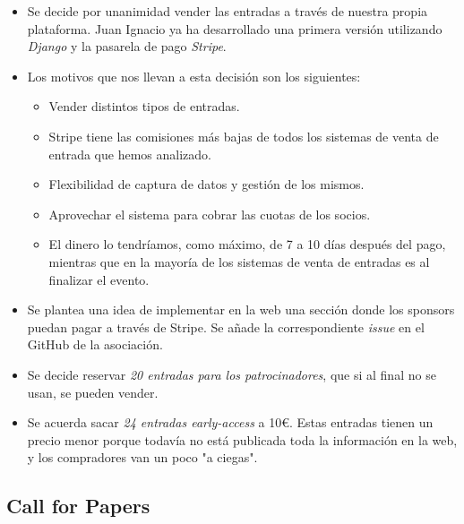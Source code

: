 \documentclass[a4paper, 12pt]{article}
\begin{document}
\begin{itemize}
    \item Se decide por unanimidad vender las entradas a través de nuestra propia plataforma. Juan Ignacio ya ha desarrollado una primera versión utilizando \textit{Django} y la pasarela de pago \textit{Stripe}.
    \item Los motivos que nos llevan a esta decisión son los siguientes:
    \begin{itemize}
        \item Vender distintos tipos de entradas.
        \item Stripe tiene las comisiones más bajas de todos los sistemas de venta de entrada que hemos analizado.
        \item Flexibilidad de captura de datos y gestión de los mismos.
        \item Aprovechar el sistema para cobrar las cuotas de los socios.
        \item El dinero lo tendríamos, como máximo, de 7 a 10 días después del pago, mientras que en la mayoría de los sistemas de venta de entradas es al finalizar el evento.
    \end{itemize}
    \item Se plantea una idea de implementar en la web una sección donde los sponsors puedan pagar a través de Stripe. Se añade la correspondiente \textit{issue} en el GitHub de la asociación.
    \item Se decide reservar \textit{20 entradas para los patrocinadores}, que si al final no se usan, se pueden vender.
    \item Se acuerda sacar \textit{24 entradas early-access} a 10\euro. Estas entradas tienen un precio menor porque todavía no está publicada toda la información en la web, y los compradores van un poco "a ciegas".
\end{itemize}

\subsection*{Call for Papers}
\end{document}
